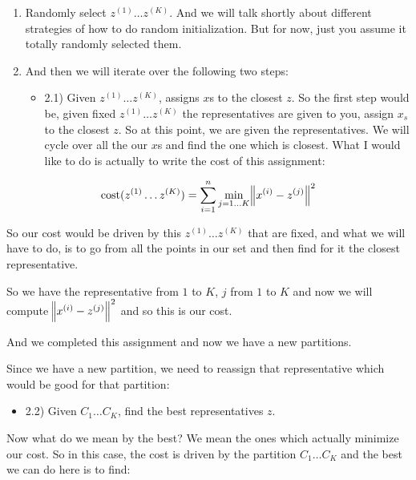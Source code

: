 \documentclass[a4paper, 12pt]{article}
\begin{document}
\begin{enumerate}
\item Randomly select \(z^{(1)} \ldots z^{(K)}\). And we will talk shortly about
different strategies of how to do random initialization. But for now, just
you assume it totally randomly selected them.

\item And then we will iterate over the following two steps:

\begin{itemize}
\item 2.1) Given \(z^{(1)} \ldots z^{(K)}\), assigns \(x\)s to the closest \(z\). So
the first step would be, given fixed \(z^{(1)} \ldots z^{(K)}\) the
representatives are given to you, assign \(x_s\) to the closest \(z\). So
at this point, we are given the representatives. We will cycle over all
the our \(x\)s and find the one which is closest. What I would like to do is
actually to write the cost of this assignment:
\end{itemize}
\end{enumerate}

\begin{equation}
\text{cost}(z^{(1)} \ldots z^{(K)})=\sum_{i=1}^{n} \min_{j=1 \ldots K} \norm{x^{(i)} - z^{(j)}}^2
\end{equation}

So our cost would be driven by this \(z^{(1)} \ldots z^{(K)}\) that are fixed,
and what we will have to do, is to go from all the points in our set and then
find for it the closest representative.

So we have the representative from \(1\) to \(K\), \(j\) from \(1\) to \(K\) and now we will
compute \(\norm{x^{(i)} - z^{(j)}}^2\) and so this is our cost.

And we completed this assignment and now we have a new partitions.

Since we have a new partition, we need to reassign that representative which
would be good for that partition:

\begin{itemize}
\item 2.2) Given \(C_1 \ldots C_K\), find the best representatives \(z\).
\end{itemize}

Now what do we mean by the best? We mean the ones which actually minimize our
cost. So in this case, the cost is driven by the partition \(C_1 \ldots C_K\)
and the best we can do here is to find:
\end{document}
